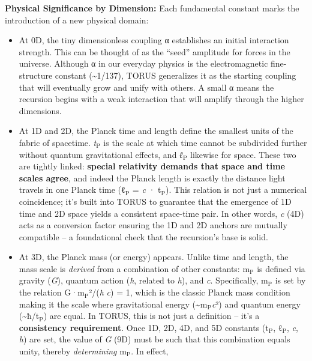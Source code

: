 \documentclass[]{article}
\newcommand{\subscript}[1]{\ensuremath{_{\mathrm{#1}}}}
\begin{document}
\textbf{Physical Significance by Dimension:} Each fundamental constant
marks the introduction of a new physical domain:

\begin{itemize}
\item
  At 0D, the tiny dimensionless coupling α establishes an initial
  interaction strength. This can be thought of as the ``seed'' amplitude
  for forces in the universe. Although α in our everyday physics is the
  electromagnetic fine-structure constant (\textasciitilde{}1/137),
  TORUS generalizes it as the starting coupling that will eventually
  grow and unify with others. A small α means the recursion begins with
  a weak interaction that will amplify through the higher dimensions.
\item
  At 1D and 2D, the Planck time and length define the smallest units of
  the fabric of spacetime.
  \emph{t\subscript{P}} is
  the scale at which time cannot be subdivided further without quantum
  gravitational effects, and
  \emph{ℓ\subscript{P}}
  likewise for space. These two are tightly linked: \textbf{special
  relativity demands that space and time scales agree}, and indeed the
  Planck length is exactly the distance light travels in one Planck time
  (ℓ\subscript{P} =
  \emph{c} ·
  t\subscript{P})​. This
  relation is not just a numerical coincidence; it's built into TORUS to
  guarantee that the emergence of 1D time and 2D space yields a
  consistent space-time pair. In other words, \emph{c} (4D) acts as a
  conversion factor ensuring the 1D and 2D anchors are mutually
  compatible -- a foundational check that the recursion's base is solid.
\item
  At 3D, the Planck mass (or energy) appears. Unlike time and length,
  the mass scale is \emph{derived} from a combination of other
  constants: m\subscript{P}
  is defined via gravity (\emph{G}), quantum action (\emph{ħ}, related
  to \emph{h}), and \emph{c}. Specifically,
  m\subscript{P} is set by
  the relation
  G·m\subscript{P}²/(\emph{ħ}
  \emph{c}) = 1, which is the classic Planck mass condition making it
  the scale where gravitational energy
  (\textasciitilde{}m\subscript{P}\emph{c}²)
  and quantum energy
  (\textasciitilde{}ħ/t\subscript{P})
  are equal. In TORUS, this is not just a definition -- it's a
  \textbf{consistency requirement}. Once 1D, 2D, 4D, and 5D constants
  (t\subscript{P},
  ℓ\subscript{P}, \emph{c},
  \emph{h}) are set, the value of \emph{G} (9D) must be such that this
  combination equals unity​, thereby \emph{determining}
  m\subscript{P}. In
  effect,

\end{itemize}
\end{document}
